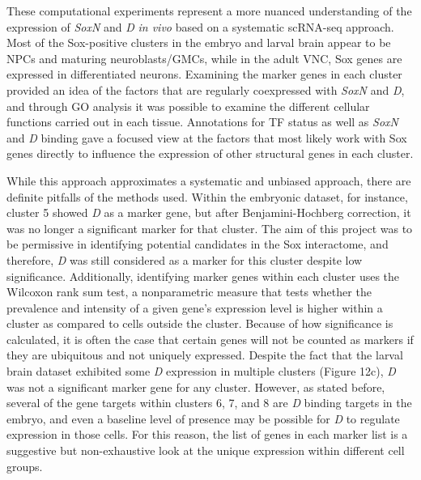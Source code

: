 \documentclass[withindex,glossary]{cam-thesis}
\begin{document}
These computational experiments represent a more nuanced understanding
of the expression of \emph{SoxN} and \emph{D} \emph{in vivo} based on a
systematic scRNA-seq approach. Most of the Sox-positive clusters in the
embryo and larval brain appear to be NPCs and maturing neuroblasts/GMCs,
while in the adult VNC, Sox genes are expressed in differentiated
neurons. Examining the marker genes in each cluster provided an idea of
the factors that are regularly coexpressed with \emph{SoxN} and
\emph{D}, and through GO analysis it was possible to examine the
different cellular functions carried out in each tissue. Annotations for
TF status as well as \emph{SoxN} and \emph{D} binding gave a focused
view at the factors that most likely work with Sox genes directly to
influence the expression of other structural genes in each cluster.

While this approach approximates a systematic and unbiased approach,
there are definite pitfalls of the methods used. Within the embryonic
dataset, for instance, cluster 5 showed \emph{D} as a marker gene, but
after Benjamini-Hochberg correction, it was no longer a significant
marker for that cluster. The aim of this project was to be permissive in
identifying potential candidates in the Sox interactome, and therefore,
\emph{D} was still considered as a marker for this cluster despite low
significance. Additionally, identifying marker genes within each cluster
uses the Wilcoxon rank sum test, a nonparametric measure that tests
whether the prevalence and intensity of a given gene's expression level
is higher within a cluster as compared to cells outside the cluster.
Because of how significance is calculated, it is often the case that
certain genes will not be counted as markers if they are ubiquitous and
not uniquely expressed. Despite the fact that the larval brain dataset
exhibited some \emph{D} expression in multiple clusters (Figure 12c),
\emph{D} was not a significant marker gene for any cluster. However, as
stated before, several of the gene targets within clusters 6, 7, and 8
are \emph{D} binding targets in the embryo, and even a baseline level of
presence may be possible for \emph{D} to regulate expression in those
cells. For this reason, the list of genes in each marker list is a
suggestive but non-exhaustive look at the unique expression within
different cell groups.
\end{document}
